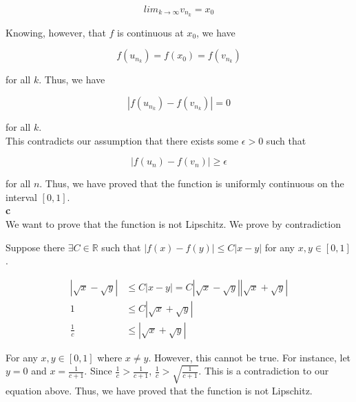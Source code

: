 \documentclass[addpoints]{exam}
\begin{document}
\begin{questions}
\[lim_{k \to \infty} v_{n_k} = x_0\]

Knowing, however, that $f$ is continuous at $x_0$, we have 

\[f(u_{n_k}) = f(x_0) = f(v_{n_k})\]

for all $k$. Thus, we have

\[|f(u_{n_k}) - f(v_{n_k})| = 0\]

for all $k$.\\

This contradicts our assumption that there exists some $\epsilon > 0$ such that

\[|f(u_n) - f(v_n)| \geq \epsilon\]

for all $n$. Thus, we have proved that the function is uniformly continuous on the interval $[0, 1]$.\\

\textbf{c}\\

We want to prove that the function is not Lipschitz. We prove by contradiction


Suppose there $\exists C \in \mathbb{R}$ such that $|f(x) - f(y)| \leq C|x - y|$ for any $x, y \in [0, 1]$. 

\begin{align*}
    |\sqrt{x} - \sqrt{y}| &\leq C|x - y| = C|\sqrt{x} - \sqrt{y}||\sqrt{x} + \sqrt{y}|\\
    1 &\leq C|\sqrt{x} + \sqrt{y}|\\
    \frac{1}{c} &\leq |\sqrt{x} + \sqrt{y}|
\end{align*}

For any $x, y \in [0, 1]$ where $x \neq y$. However, this cannot be true. For instance, let $y = 0$
and $x = \frac{1}{c + 1}$. Since $\frac{1}{c} > \frac{1}{c + 1}$, $\frac{1}{c} > \sqrt{\frac{1}{c + 1}}$. This is 
a contradiction to our equation above. Thus, we have proved that the function is not Lipschitz.\\



\end{questions}
\end{document}
